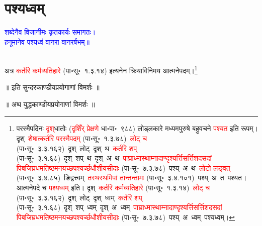 \section[पश्यध्वम्]{पश्यध्वम्}
\centering\textcolor{blue}{शब्देनैव विजानीमः कृतकार्यः समागतः।\nopagebreak\\
हनूमानेव पश्यध्वं वानरा वानरर्षभम्॥}\nopagebreak\\
\\
\fontsize{14}{21}\selectfont\begin{sloppypar}\justifying\noindent\hspace{10mm} अत्र \textcolor{red}{कर्तरि कर्म\-व्यतिहारे} (पा॰सू॰~१.३.१४) इत्यनेन क्रिया\-विनिमय आत्मनेपदम्।\footnote{परस्मै\-पदिनः \textcolor{red}{दृश्‌}\-धातोः (\textcolor{red}{दृशिँर् प्रेक्षणे} धा॰पा॰~९८८) लोड्लकारे मध्यम\-पुरुषे बहुवचने \textcolor{red}{पश्यत} इति रूपम्। दृश्~\arrow \textcolor{red}{शेषात्कर्तरि परस्मैपदम्} (पा॰सू॰~१.३.७८)~\arrow \textcolor{red}{लोट् च} (पा॰सू॰~३.३.१६२)~\arrow दृश्~लोट्~\arrow दृश्~थ~\arrow \textcolor{red}{कर्तरि शप्} (पा॰सू॰~३.१.६८)~\arrow दृश्~शप्~थ~\arrow दृश्~अ~थ~\arrow \textcolor{red}{पाघ्रा\-ध्मास्थाम्ना\-दाण्दृश्यर्त्ति\-सर्त्तिशदसदां पिब\-जिघ्र\-धम\-तिष्ठ\-मन\-यच्छ\-पश्यर्च्छ\-धौ\-शीय\-सीदाः} (पा॰सू॰~७.३.७८)~\arrow पश्य्~अ~थ~\arrow \textcolor{red}{लोटो लङ्वत्‌} (पा॰सू॰~३.४.८५)~\arrow ङिद्वत्त्वम्~\arrow \textcolor{red}{तस्थस्थमिपां तान्तन्तामः} (पा॰सू॰~३.४.१०१)~\arrow पश्य्~अ~त~\arrow पश्यत। आत्मनेपदे च \textcolor{red}{पश्यध्वम्} इति। दृश्~\arrow \textcolor{red}{कर्तरि कर्मव्यतिहारे} (पा॰सू॰~१.३.१४)~\arrow \textcolor{red}{लोट् च} (पा॰सू॰~३.३.१६२)~\arrow दृश्~लोट्~\arrow दृश्~ध्वम्~\arrow \textcolor{red}{कर्तरि शप्} (पा॰सू॰~३.१.६८)~\arrow दृश्~शप्~ध्वम्~\arrow दृश्~अ~ध्वम्~\arrow \textcolor{red}{पाघ्रा\-ध्मास्थाम्ना\-दाण्दृश्यर्त्ति\-सर्त्तिशदसदां पिब\-जिघ्र\-धम\-तिष्ठ\-मन\-यच्छ\-पश्यर्च्छ\-धौ\-शीय\-सीदाः} (पा॰सू॰~७.३.७८)~\arrow पश्य्~अ~ध्वम्~\arrow पश्यध्वम्।}\end{sloppypar}
\vspace{2mm}
\centering ॥ इति सुन्दरकाण्डीयप्रयोगाणां विमर्शः ॥\nopagebreak\\
\vspace{4mm}
{}
\centering ॥ अथ युद्धकाण्डीयप्रयोगाणां विमर्शः ॥\nopagebreak\\
